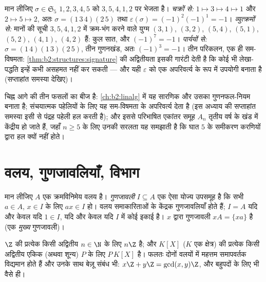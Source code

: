 \begin{example}[एक ही चिह्न तक तीन रास्ते]\label{ex:b2:structures:threeroads}
मान लीजिए $\sigma \in \mathfrak{S}_5$ $1, 2, 3, 4, 5$ को $3, 5, 4,
1, 2$ पर भेजता है। \emph{चक्रों से:} $1 \mapsto 3 \mapsto 4 \mapsto 1$ और $2
\mapsto 5 \mapsto 2$,
अतः $\sigma = (1\,3\,4)(2\,5)$ तथा $\varepsilon(\sigma) = (-1)^{2}(-1)^{1} = -1$। \emph{व्युत्क्रमों से:} मानों की सूची $3, 5, 4, 1, 2$ में
क्रम-भंग करने वाले युग्म $(3,1)$, $(3,2)$, $(5,4)$, $(5,1)$, $(5,2)$, $(4,1)$, $(4,2)$ हैं:
कुल सात, और $(-1)^7 = -1$। \emph{पार्ययों से:} $\sigma = (1\,4)(1\,3)(2\,5)$, तीन गुणनखंड, अतः $(-1)^3 = -1$।
तीन परिकलन, एक ही सम-विषमता: \cref{thm:b2:structures:signature} की अद्वितीयता इसकी गारंटी देती है कि
कोई भी लेखा-पद्धति इन्हें कभी असहमत नहीं कर सकती --- और यही $\varepsilon$ को
एक अपरिवर्त्य के रूप में उपयोगी बनाता है (सप्ताहांत समस्या देखिए)।
\end{example}

\begin{remark}[यहाँ से चिह्न कहाँ जाता है]
चिह्न आगे की तीन फसलों का बीज है: \cref{ch:b2:linalg} में यह सारणिक और उसका
गुणनफल-नियम बनाता है; संचयात्मक पहेलियों के लिए यह सम-विषमता के
अपरिवर्त्य देता है (इस अध्याय की सप्ताहांत समस्या इसी से पंद्रह पहेली
हल करती है); और इससे परिभाषित एकांतर समूह $A_n$ तृतीय वर्ष के खंड में
केंद्रीय हो जाते हैं, जहाँ $n \geq 5$ के लिए उनकी सरलता यह समझाती है कि घात
$5$ के समीकरण करणियों द्वारा हल क्यों नहीं होते।
\end{remark}

\section{वलय, गुणजावलियाँ, विभाग}

\begin{definition}[गुणजावली]\label{def:b2:structures:ideal}
मान लीजिए $A$ एक क्रमविनिमेय वलय है। \emph{गुणजावली}
$I
\subseteq A$ एक ऐसा योज्य उपसमूह है कि सभी $a \in A$, $x \in I$ के लिए $a x \in I$ हो। वलय
समाकारिताओं के केंद्रक गुणजावलियाँ होते हैं; $I = A$ यदि और केवल यदि $1 \in I$,
यदि और केवल यदि $I$ में कोई इकाई है। $x$ द्वारा \emph{} गुणजावली
$xA = \{xa\}$ है (एक \emph{मुख्य} गुणजावली)।
\end{definition}

\begin{theorem}[{$\Z$ तथा $K[X]$ की गुणजावलियाँ}]\label{thm:b2:structures:principal}
$\Z$ की प्रत्येक  किसी अद्वितीय $n \in \N$ के लिए $n\Z$ है; और $K[X]$ ($K$
एक क्षेत्र) की प्रत्येक  किसी अद्वितीय एकिक (अथवा शून्य) $P$
के लिए $P\,K[X]$ है। फलतः दोनों वलयों में महत्तम समापवर्तक विद्यमान होते हैं
और उनके साथ बेज़ू संबंध भी: $x\Z +
y\Z = \gcd(x,y)\Z$, और बहुपदों के लिए भी वैसे ही।
\end{theorem}

